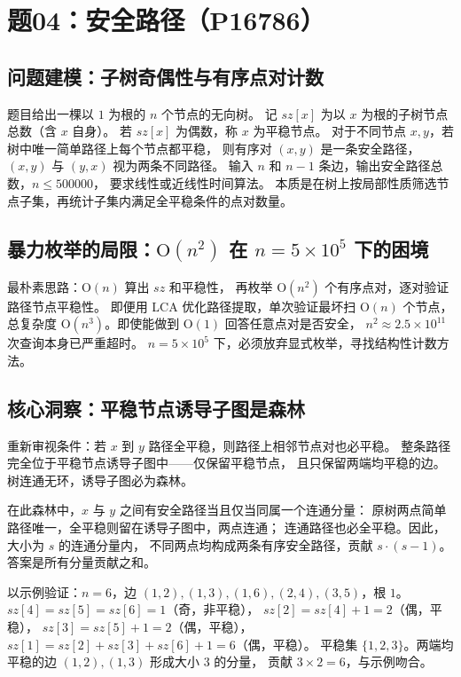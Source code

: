 \section{题04：安全路径（P16786）}

\subsection{问题建模：子树奇偶性与有序点对计数}

题目给出一棵以 $1$ 为根的 $n$ 个节点的无向树。
记 $\mathit{sz}[x]$ 为以 $x$ 为根的子树节点总数（含 $x$ 自身）。
若 $\mathit{sz}[x]$ 为偶数，称 $x$ 为平稳节点。
对于不同节点 $x,y$，若树中唯一简单路径上每个节点都平稳，
则有序对 $(x,y)$ 是一条安全路径，$(x,y)$ 与 $(y,x)$ 视为两条不同路径。
输入 $n$ 和 $n-1$ 条边，输出安全路径总数，$n \le 500000$，
要求线性或近线性时间算法。
本质是在树上按局部性质筛选节点子集，再统计子集内满足全平稳条件的点对数量。

\subsection{暴力枚举的局限：$\mathrm{O}(n^2)$ 在 $n=5\times10^5$ 下的困境}

最朴素思路：$\mathrm{O}(n)$ 算出 $\mathit{sz}$ 和平稳性，
再枚举 $\mathrm{O}(n^2)$ 个有序点对，逐对验证路径节点平稳性。
即便用 LCA 优化路径提取，单次验证最坏扫 $\mathrm{O}(n)$ 个节点，
总复杂度 $\mathrm{O}(n^3)$。即使能做到 $\mathrm{O}(1)$ 回答任意点对是否安全，
$n^2 \approx 2.5\times10^{11}$ 次查询本身已严重超时。
$n=5\times10^5$ 下，必须放弃显式枚举，寻找结构性计数方法。

\subsection{核心洞察：平稳节点诱导子图是森林}

重新审视条件：若 $x$ 到 $y$ 路径全平稳，则路径上相邻节点对也必平稳。
整条路径完全位于平稳节点诱导子图中——仅保留平稳节点，
且只保留两端均平稳的边。树连通无环，诱导子图必为森林。

在此森林中，$x$ 与 $y$ 之间有安全路径当且仅当同属一个连通分量：
原树两点简单路径唯一，全平稳则留在诱导子图中，两点连通；
连通路径也必全平稳。因此，大小为 $s$ 的连通分量内，
不同两点均构成两条有序安全路径，贡献 $s\cdot(s-1)$。
答案是所有分量贡献之和。

以示例验证：$n=6$，边 $(1,2),(1,3),(1,6),(2,4),(3,5)$，根 $1$。
$\mathit{sz}[4]=\mathit{sz}[5]=\mathit{sz}[6]=1$（奇，非平稳），
$\mathit{sz}[2]=\mathit{sz}[4]+1=2$（偶，平稳），
$\mathit{sz}[3]=\mathit{sz}[5]+1=2$（偶，平稳），
$\mathit{sz}[1]=\mathit{sz}[2]+\mathit{sz}[3]+\mathit{sz}[6]+1=6$（偶，平稳）。
平稳集 $\{1,2,3\}$。两端均平稳的边 $(1,2),(1,3)$ 形成大小 $3$ 的分量，
贡献 $3\times2=6$，与示例吻合。

